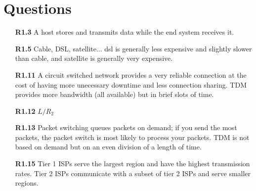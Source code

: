 \documentclass{article}
\begin{document}
\section*{Questions}
\begin{enumerate}

 \item[\textbf{R1.3}]
  A host stores and transmits data while the end system receives it.
 \item[\textbf{R1.5}]
  Cable, DSL, satellite... dsl is generally less expensive and slightly slower
  than cable, and satellite is generally very expensive.
 \item[\textbf{R1.11}]
  A circuit switched network provides a very reliable connection at the cost of
  having more unecessary downtime and less connection sharing. TDM provides
  more bandwidth (all available) but in brief slots of time.
 \item[\textbf{R1.12}]
  $L/R_2$
 \item[\textbf{R1.13}]
  Packet switching queues packets on demand; if you send the most packets, the
  packet switch is most likely to process your packets. TDM is not based on
  demand but on an even division of a length of time.
 \item[\textbf{R1.15}]
  Tier 1 ISPs serve the largest region and have the highest transmission rates.
  Tier 2 ISPs communicate with a subset of tier 2 ISPs and serve smaller
  regions.

\end{enumerate}
\end{document}
